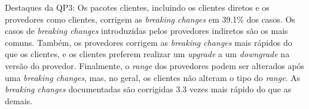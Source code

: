 \begin{mdframed}
Destaques da QP3: Os pacotes clientes, incluindo os clientes diretos e os provedores como clientes, corrigem as \textit{breaking changes} em 39.1\% dos casos. Os casos de \textit{breaking changes} introduzidas pelos provedores indiretos são os mais comuns. Também, os provedores corrigem as \textit{breaking changes} mais rápidos do que os clientes, e os clientes preferem realizar um \textit{upgrade} a um \textit{downgrade} na versão do provedor. Finalmente, o \textit{range} dos provedores podem ser alterados após uma \textit{breaking changes}, mas, no geral, os clientes não alteram o tipo do \textit{range}. As \textit{breaking changes} documentadas são corrigidas 3.3 vezes mais rápido do que as demais.
\end{mdframed}